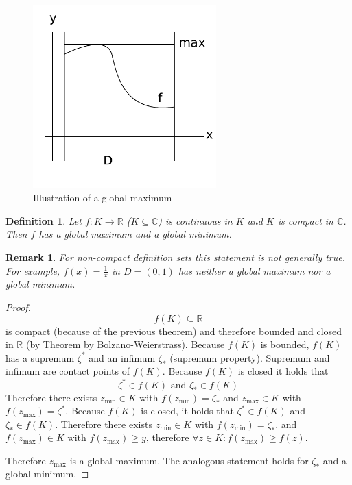 \documentclass[a4paper,landscape,twocolumn]{article}
\newtheorem{defi}{Definition}
\newtheorem{rem}{Remark}
\begin{document}
\begin{figure}[!h]
  \begin{center}
    \includegraphics[width=200pt]{img/global_maximum.pdf}
    \caption{Illustration of a global maximum}
  \end{center}
\end{figure}

\begin{defi}
  Let $f: K \rightarrow \mathbb R$ ($K \subseteq \mathbb C$) is continuous in $K$
  and $K$ is compact in $\mathbb C$. Then $f$ has a global maximum and a global
  minimum.
\end{defi}

\begin{rem}
  For non-compact definition sets this statement is not generally true.
  For example, $f(x) = \frac1x$ in $D = (0, 1)$ has neither a global maximum
  nor a global minimum.
\end{rem}
\begin{proof}
  \[ f(K) \subseteq \mathbb R \]
  is compact (because of the previous theorem) and therefore bounded and
  closed in $\mathbb R$ (by Theorem by Bolzano-Weierstrass).
  Because $f(K)$ is bounded, $f(K)$ has a supremum $\zeta^*$ and an infimum $\zeta_*$
  (supremum property). Supremum and infimum are contact points of $f(K)$.
  Because $f(K)$ is closed it holds that
  \[ \zeta^* \in f(K) \text{ and } \zeta_* \in f(K) \]
  Therefore there exists $z_{\text{min}} \in K$ with $f(z_{\text{min}}) = \zeta_*$
  and $z_{\text{max}} \in K$ with $f(z_{\text{max}}) = \zeta^*$.
  Because $f(K)$ is closed, it holds that $\zeta^* \in f(K)$ and $\zeta_* \in f(K)$.
  Therefore there exists $z_{\text{min}} \in K$ with $f(z_{\text{min}}) = \zeta_*$.
  and $f(z_{\text{max}}) \in K$ with $f(z_{\text{max}}) \geq y$, therefore
  $\forall z \in K: f(z_{\text{max}}) \geq f(z)$.

  Therefore $z_{\text{max}}$ is a global maximum. The analogous statement holds
  for $\zeta_*$ and a global minimum.
\end{proof}
\end{document}

